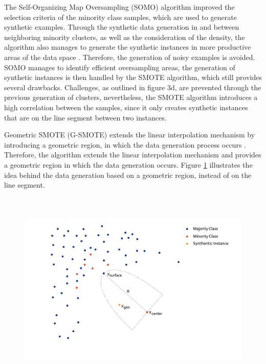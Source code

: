 \documentclass[parskip=full]{scrartcl}
\begin{document}
The Self-Organizing Map Oversampling (SOMO) algorithm improved the selection
criteria of the minority class samples, which are used to generate synthetic
examples. Through the synthetic data generation in and between neighboring
minority clusters, as well as the consideration of the density, the algorithm
also manages to generate the synthetic instances in more productive areas of the
data space \cite{Douzas2017B}. Therefore, the generation of noisy examples is
avoided. SOMO manages to identify efficient oversampling areas, the generation
of synthetic instances is then handled by the SMOTE algorithm, which still
provides several drawbacks. Challenges, as outlined in figure 3d, are prevented
through the previous generation of clusters, nevertheless, the SMOTE algorithm
introduces a high correlation between the samples, since it only creates
synthetic instances that are on the line segment between two instances.

Geometric SMOTE (G-SMOTE) extends the linear interpolation mechanism by
introducing a geometric region, in which the data generation process occurs
\cite{Douzas2017}. Therefore, the algorithm extends the linear interpolation
mechanism and provides a geometric region in which the data generation occurs.
Figure \ref{fig:GSMOTE} illustrates the idea behind the data generation based on a geometric
region, instead of on the line segment. 

\begin{figure}[H]
	\centering
	\includegraphics[width=12cm, height=9.5cm, keepaspectratio]{./resources/fig4.png}
	\label{fig:GSMOTE}
\end{figure}
\end{document}
